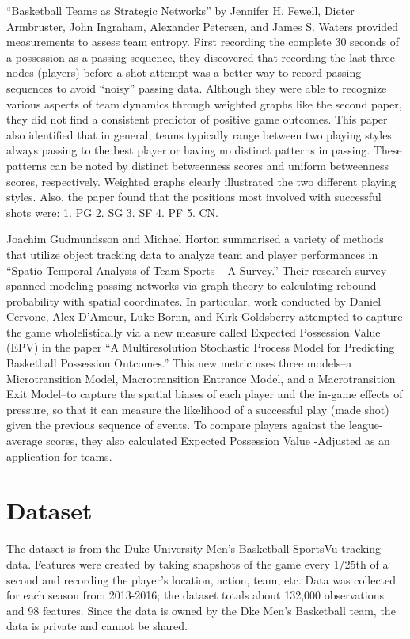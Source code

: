 \documentclass[12pt,twoside]{dukestatscithesis}
\theoremstyle{definition}
\theoremstyle{definition}
\theoremstyle{definition}
\theoremstyle{remark}
\begin{document}
``Basketball Teams as Strategic Networks'' by Jennifer H. Fewell, Dieter
Armbruster, John Ingraham, Alexander Petersen, and James S. Waters
provided measurements to assess team entropy. First recording the
complete 30 seconds of a possession as a passing sequence, they
discovered that recording the last three nodes (players) before a shot
attempt was a better way to record passing sequences to avoid ``noisy''
passing data. Although they were able to recognize various aspects of
team dynamics through weighted graphs like the second paper, they did
not find a consistent predictor of positive game outcomes. This paper
also identified that in general, teams typically range between two
playing styles: always passing to the best player or having no distinct
patterns in passing. These patterns can be noted by distinct betweenness
scores and uniform betweenness scores, respectively. Weighted graphs
clearly illustrated the two different playing styles. Also, the paper
found that the positions most involved with successful shots were: 1. PG
2. SG 3. SF 4. PF 5. CN.

Joachim Gudmundsson and Michael Horton summarised a variety of methods
that utilize object tracking data to analyze team and player
performances in ``Spatio-Temporal Analysis of Team Sports -- A Survey.''
Their research survey spanned modeling passing networks via graph theory
to calculating rebound probability with spatial coordinates. In
particular, work conducted by Daniel Cervone, Alex D'Amour, Luke Bornn,
and Kirk Goldsberry attempted to capture the game wholelistically via a
new measure called Expected Possession Value (EPV) in the paper ``A
Multiresolution Stochastic Process Model for Predicting Basketball
Possession Outcomes.'' This new metric uses three models--a
Microtransition Model, Macrotransition Entrance Model, and a
Macrotransition Exit Model--to capture the spatial biases of each player
and the in-game effects of pressure, so that it can measure the
likelihood of a successful play (made shot) given the previous sequence
of events. To compare players against the league-average scores, they
also calculated Expected Possession Value -Adjusted as an application
for teams.

\chapter{Dataset}\label{dataset}

The dataset is from the Duke University Men's Basketball SportsVu
tracking data. Features were created by taking snapshots of the game
every 1/25th of a second and recording the player's location, action,
team, etc. Data was collected for each season from 2013-2016; the
dataset totals about 132,000 observations and 98 features. Since the
data is owned by the Dke Men's Basketball team, the data is private and
cannot be shared.
\end{document}
